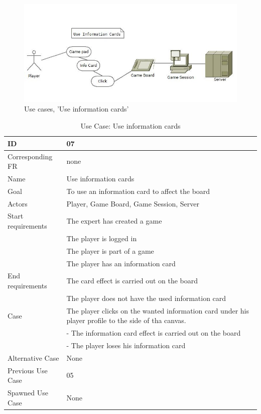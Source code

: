 \begin{figure}[H]
  \centering
    \includegraphics[width=1.0\textwidth]{img/useinfocards.jpg}
  \caption{Use cases, 'Use information cards'} 
  \label{fig:useinformationcards}
\end{figure}


\begin{table}[H]
\begin{tabular}{|l|p{14cm}|}
\hline
	\textbf{ID} & \textbf{07}\\ \hline
	Corresponding FR & none\\ \hline
	Name & Use information cards\\ \hline
	Goal & To use an information card to affect the board\\ \hline
	Actors & Player, Game Board, Game Session, Server\\ \hline
	Start requirements & The expert has created a game\\
				& The player is logged in\\
				& The player is part of a game\\
				& The player has an information card \\ \hline
	End requirements & The card effect is carried out on the board\\
				& The player does not have the used information card \\ \hline
	Case & The player clicks on the wanted information card under his player profile to the side of tha canvas.\\
		&- The information card effect is carried out on the board\\
		&- The player loses his information card \\ \hline
	Alternative Case & None \\ \hline
	Previous Use Case & 05\\ \hline
	Spawned Use Case & None\\ \hline
\end{tabular}
\caption{Use Case: Use information cards}
\label{fig:usecase07table}
\end{table}



